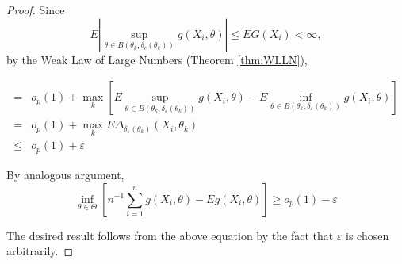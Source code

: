 \begin{proof}
    Since
    \begin{equation*}
        E\left|\sup_{\theta\in B\left(\theta_{k},\delta_{c}\left(\theta_{k}\right)\right)}g\left(X_{i},\theta\right)\right|\leq EG\left(X_{i}\right)<\infty,
    \end{equation*}
    by the Weak Law of Large Numbers (Theorem \ref{thm:WLLN}),

    \begin{equation*}
        \begin{aligned}
            =& o_{p}(1)+\max_{k}\left[E\sup_{\theta\in B\left(\theta_{k},\delta_{\varepsilon}\left(\theta_{k}\right)\right)}g\left(X_{i},\theta\right)-E\inf_{\theta\in B\left(\theta_{k},\delta_{\varepsilon}\left(\theta_{k}\right)\right)}g\left(X_{i},\theta\right)\right] \\
            =& o_{p}(1)+\max_{k}E\Delta_{\delta_{\varepsilon}\left(\theta_{k}\right)}\left(X_{i},\theta_{k}\right) \\
            \leq& o_{p}(1)+\varepsilon
        \end{aligned}
    \end{equation*}

    By analogous argument,
    \begin{equation*}
        \inf _{\theta \in \Theta}\left[n^{-1} \sum_{i=1}^{n} g\left(X_{i}, \theta\right)-E g\left(X_{i}, \theta\right)\right] \geq o_{p}(1)-\varepsilon
    \end{equation*}

    The desired result follows from the above equation by the fact that $\varepsilon$ is chosen arbitrarily.
\end{proof}
